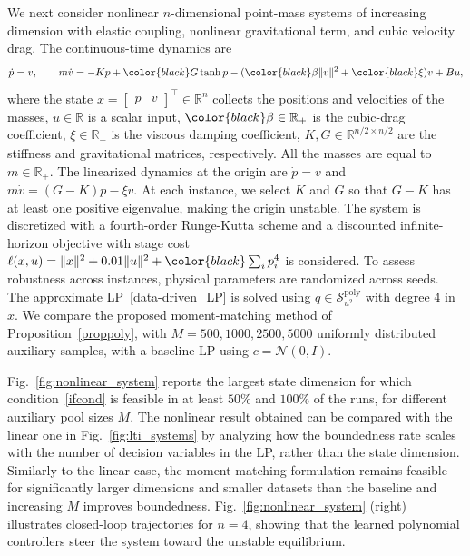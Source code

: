 \documentclass[journal,twoside,web]{ieeecolor}
\newcommand{\Sc}{\mathcal{S}}
\newcommand{\review}{\color{black}}
\begin{document}
We next consider nonlinear $n$-dimensional point-mass systems of increasing dimension with elastic coupling, {\review nonlinear gravitational term,} and cubic velocity drag. 
The continuous-time dynamics are
\begin{equation*}
\dot p = v, 
\qquad
m \dot v = -Kp + {\review G\tanh{p}} -({\review\beta}\|v\|^2 + {\review\xi}) v + Bu,
\end{equation*}
where the state $x = \begin{bmatrix}
    p & v
\end{bmatrix}^\top \in \mathbb{R}^{n}$ collects the positions and velocities of the masses, $u \in \mathbb{R}$ is a scalar input, ${\review\beta}\in\mathbb{R}_+$ is the cubic-drag coefficient, {\review $\xi \in\mathbb{R}_+$ is the viscous damping coefficient, $K,G\in\mathbb{R}^{n/2 \times n/2}$ are the stiffness and gravitational matrices, respectively. All the masses are equal to $m\in\mathbb{R}_+$. The linearized dynamics at the origin are $\dot p = v$ and $m \dot v = (G-K)p-\xi v$. At each instance, we select $K$ and $G$ so that $G-K$ has at least one positive eigenvalue, making the origin unstable.} The system is discretized with {\review a fourth-order Runge-Kutta scheme} and a discounted infinite-horizon objective with stage cost $\ell(x,u)=\|x\|^2+0.01\|u\|^2+{\review\sum_i p_i^4}$ is considered. To assess robustness across instances, physical parameters are randomized across seeds. The approximate LP~\eqref{data-driven_LP} is solved using $q\in\Sc^{\text{poly}}_{u^2}$ with degree 4 in $x$.
We compare the proposed moment-matching method of Proposition~\ref{proppoly}, with $M=500, 1000, 2500, 5000$ uniformly distributed auxiliary samples, with a baseline LP using $c=\mathcal{N}(0,I)$.

    Fig.~\ref{fig:nonlinear_system} {\review reports the largest state dimension for which condition~\eqref{ifcond} is feasible in at least $50\%$ and $100\%$ of the runs, for different auxiliary pool sizes $M$. The nonlinear result obtained can be compared with the linear one in Fig.~\ref{fig:lti_systems} by analyzing how the boundedness rate scales with the number of decision variables in the LP, rather than the state dimension. Similarly to the linear case, the moment-matching formulation remains feasible for significantly larger dimensions and smaller datasets than the baseline and increasing $M$ improves boundedness. Fig.~\ref{fig:nonlinear_system} (right) illustrates closed-loop trajectories for $n=4$, showing that the learned polynomial controllers steer the system toward the unstable equilibrium.}
\end{document}
